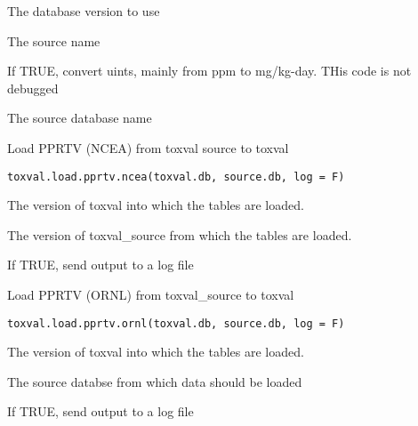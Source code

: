 \documentclass[letterpaper]{book}
\begin{document}
%
\begin{Arguments}
\begin{ldescription}
\item[\code{toxval.db}] The database version to use

\item[\code{source}] The source name

\item[\code{do.convert.units}] If TRUE, convert uints, mainly from ppm to mg/kg-day. THis code is not debugged

\item[\code{sourcedb}] The source database name
\end{ldescription}
\end{Arguments}
%
\begin{Description}\relax
Load PPRTV (NCEA) from toxval source to toxval
\end{Description}
%
\begin{Usage}
\begin{verbatim}
toxval.load.pprtv.ncea(toxval.db, source.db, log = F)
\end{verbatim}
\end{Usage}
%
\begin{Arguments}
\begin{ldescription}
\item[\code{toxval.db}] The version of toxval into which the tables are loaded.

\item[\code{source.db}] The version of toxval\_source from which the tables are loaded.

\item[\code{log}] If TRUE, send output to a log file
\end{ldescription}
\end{Arguments}
%
\begin{Description}\relax
Load PPRTV (ORNL) from toxval\_source to toxval
\end{Description}
%
\begin{Usage}
\begin{verbatim}
toxval.load.pprtv.ornl(toxval.db, source.db, log = F)
\end{verbatim}
\end{Usage}
%
\begin{Arguments}
\begin{ldescription}
\item[\code{toxval.db}] The version of toxval into which the tables are loaded.

\item[\code{source.db}] The source databse from which data should be loaded

\item[\code{log}] If TRUE, send output to a log file
\end{ldescription}
\end{Arguments}
\end{document}
